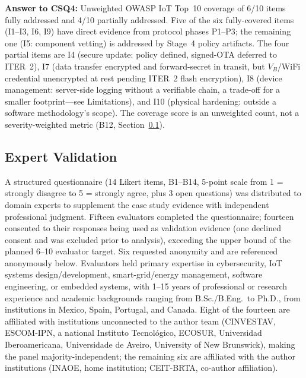 \documentclass[preprint,12pt,authoryear]{elsarticle}
\begin{document}
\textbf{Answer to CSQ4:} Unweighted OWASP IoT Top~10 coverage of 6/10 items fully addressed and 4/10 partially addressed. Five of the six fully-covered items (I1--I3, I6, I9) have direct evidence from protocol phases P1--P3; the remaining one (I5: component vetting) is addressed by Stage~4 policy artifacts. The four partial items are I4 (secure update: policy defined, signed-OTA deferred to ITER~2), I7 (data transfer encrypted and forward-secret in transit, but $V_B$/WiFi credential unencrypted at rest pending ITER~2 flash encryption), I8 (device management: server-side logging without a verifiable chain, a trade-off for a smaller footprint---see Limitations), and I10 (physical hardening: outside a software methodology's scope). The coverage score is an unweighted count, not a severity-weighted metric (B12, Section~\ref{subsec:expertval}).

\subsection{Expert Validation}
\label{subsec:expertval}

A structured questionnaire (14 Likert items, B1--B14, 5-point scale from 1 = strongly disagree to 5 = strongly agree, plus 3 open questions) was distributed to domain experts to supplement the case study evidence with independent professional judgment. Fifteen evaluators completed the questionnaire; fourteen consented to their responses being used as validation evidence (one declined consent and was excluded prior to analysis), exceeding the upper bound of the planned 6--10 evaluator target. Six requested anonymity and are referenced anonymously below. Evaluators held primary expertise in cybersecurity, IoT systems design/development, smart-grid/energy management, software engineering, or embedded systems, with 1--15 years of professional or research experience and academic backgrounds ranging from B.Sc./B.Eng.\ to Ph.D., from institutions in Mexico, Spain, Portugal, and Canada. Eight of the fourteen are affiliated with institutions unconnected to the author team (CINVESTAV, ESCOM-IPN, a national Instituto Tecnol\'{o}gico, ECOSUR, Universidad Iberoamericana, Universidade de Aveiro, University of New Brunswick), making the panel majority-independent; the remaining six are affiliated with the author institutions (INAOE, home institution; CEIT-BRTA, co-author affiliation).
\end{document}
